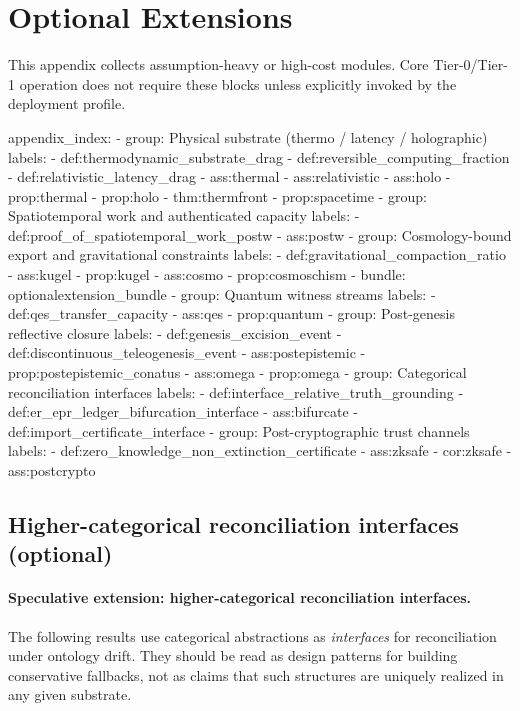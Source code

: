 \documentclass[11pt,a4paper]{article}
\theoremstyle{definition}
\theoremstyle{remark}
\begin{document}
\section{Optional Extensions}
\noindent This appendix collects assumption-heavy or high-cost modules. Core Tier-0/Tier-1 operation does not require these blocks unless explicitly invoked by the deployment profile.
\begin{YAML}
appendix_index:
  - group: Physical substrate (thermo / latency / holographic)
    labels:
      - def:thermodynamic_substrate_drag
      - def:reversible_computing_fraction
      - def:relativistic_latency_drag
      - ass:thermal
      - ass:relativistic
      - ass:holo
      - prop:thermal
      - prop:holo
      - thm:thermfront
      - prop:spacetime
  - group: Spatiotemporal work and authenticated capacity
    labels:
      - def:proof_of_spatiotemporal_work_postw
      - ass:postw
  - group: Cosmology-bound export and gravitational constraints
    labels:
      - def:gravitational_compaction_ratio
      - ass:kugel
      - prop:kugel
      - ass:cosmo
      - prop:cosmoschism
      - bundle: optionalextension_bundle
  - group: Quantum witness streams
    labels:
      - def:qes_transfer_capacity
      - ass:qes
      - prop:quantum
  - group: Post-genesis reflective closure
    labels:
      - def:genesis_excision_event
      - def:discontinuous_teleogenesis_event
      - ass:postepistemic
      - prop:postepistemic_conatus
      - ass:omega
      - prop:omega
  - group: Categorical reconciliation interfaces
    labels:
      - def:interface_relative_truth_grounding
      - def:er_epr_ledger_bifurcation_interface
      - ass:bifurcate
      - def:import_certificate_interface
  - group: Post-cryptographic trust channels
    labels:
      - def:zero_knowledge_non_extinction_certificate
      - ass:zksafe
      - cor:zksafe
      - ass:postcrypto
\end{YAML}

\subsection{Higher-categorical reconciliation interfaces (optional)}
\paragraph{Speculative extension: higher-categorical reconciliation interfaces.}
The following results use categorical abstractions as \emph{interfaces} for reconciliation under ontology drift. They should be read as design patterns for building conservative fallbacks, not as claims that such structures are uniquely realized in any given substrate.
\end{document}
